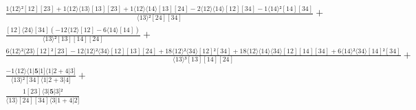 \documentclass[varwidth, border=5pt]{standalone}
\begin{document}
\begin{my}
$\begin{gathered}
\scriptscriptstyle\frac{1⟨12⟩²[12][23]+1⟨12⟩⟨13⟩[13][23]+1⟨12⟩⟨14⟩[13][24]-2⟨12⟩⟨14⟩[12][34]-1⟨14⟩²[14][34]}{⟨13⟩²[24][34]} +\\
\scriptscriptstyle\frac{[12]⟨24⟩[34](-12⟨12⟩[12]-6⟨14⟩[14])}{⟨13⟩²[13][14][24]} +\\
\scriptscriptstyle\frac{6⟨12⟩²⟨23⟩[12]²[23]-12⟨12⟩²⟨34⟩[12][13][24]+18⟨12⟩²⟨34⟩[12]²[34]+18⟨12⟩⟨14⟩⟨34⟩[12][14][34]+6⟨14⟩²⟨34⟩[14]²[34]}{⟨13⟩³[13][14][24]} +\\
\scriptscriptstyle\frac{-1⟨12⟩⟨1|𝟓|1]⟨1|2+4|3]}{⟨13⟩²[34]⟨1|2+3|4]} +\\
\scriptscriptstyle\frac{1[23]⟨3|𝟓|3]²}{⟨13⟩[24][34]⟨3|1+4|2]} \phantom{+}
\end{gathered}$
\end{my}
\end{document}
